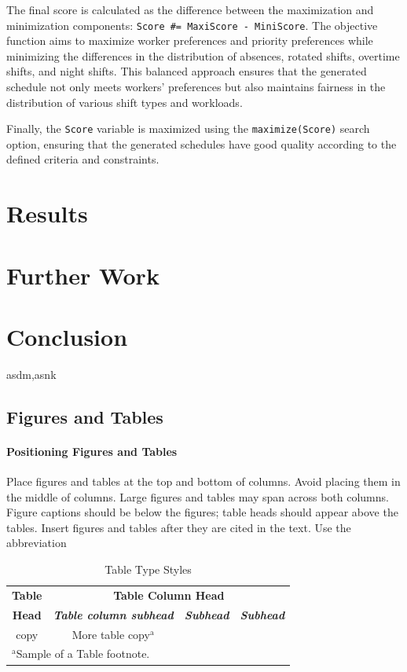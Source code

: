 \documentclass[conference]{IEEEtran}
\begin{document}
The final score is calculated as the difference between the maximization and minimization components: \texttt{Score \#= MaxiScore - MiniScore}. The objective function aims to maximize worker preferences and priority preferences while minimizing the differences in the distribution of absences, rotated shifts, overtime shifts, and night shifts. This balanced approach ensures that the generated schedule not only meets workers' preferences but also maintains fairness in the distribution of various shift types and workloads.

Finally, the \texttt{Score} variable is maximized using the  \texttt{maximize(Score)} search option, ensuring that the generated schedules have good quality according to the defined criteria and constraints.

\section{Results}
\label{section:results}

\section{Further Work}
\label{section:further-work}



\section{Conclusion}
\label{section:conclusion}

asdm,asnk

\color{red}
\subsection{Figures and Tables}
\paragraph{Positioning Figures and Tables} Place figures and tables at the top and 
bottom of columns. Avoid placing them in the middle of columns. Large 
figures and tables may span across both columns. Figure captions should be 
below the figures; table heads should appear above the tables. Insert 
figures and tables after they are cited in the text. Use the abbreviation 

\begin{table}[htbp]
\caption{Table Type Styles}
\begin{center}
\begin{tabular}{|c|c|c|c|}
\hline
\textbf{Table}&\multicolumn{3}{|c|}{\textbf{Table Column Head}} \\
\cline{2-4} 
\textbf{Head} & \textbf{\textit{Table column subhead}}& \textbf{\textit{Subhead}}& \textbf{\textit{Subhead}} \\
\hline
copy& More table copy$^{\mathrm{a}}$& &  \\
\hline
\multicolumn{4}{l}{$^{\mathrm{a}}$Sample of a Table footnote.}
\end{tabular}
\label{tab1}
\end{center}
\end{table}
\end{document}
